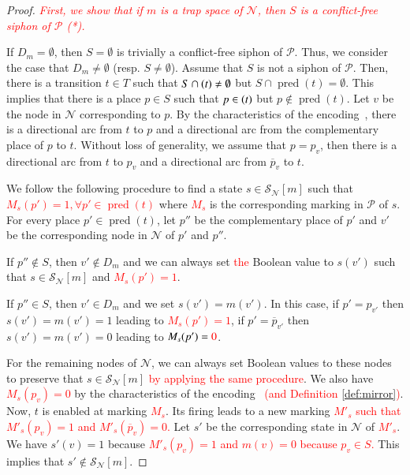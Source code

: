 \documentclass[preprint,12pt]{elsarticle}
\newcommand{\change}[1]{\textcolor{red}{#1}}
\DeclareMathOperator{\pred}{pred}
\let\succ\relax
\DeclareMathOperator{\succ}{succ}
\begin{document}
\begin{proof}

  \change{\textit{First, we show that if \(m\) is a trap space of \(\mathcal{N}\), then \(S\) is a conflict-free siphon of \(\mathcal{P}\) (*).}}

  If \(D_m = \emptyset\), then \(S = \emptyset\) is trivially a conflict-free siphon of \(\mathcal{P}\).
  Thus, we consider the case that \(D_m \neq \emptyset\) (resp. \(S \neq \emptyset\)).
  Assume that \(S\) is not a siphon of \(\mathcal{P}\).
  Then, there is a transition \(t \in T\) such that \(S \cap \succ(t) \neq \emptyset\) but \(S \cap \pred(t) = \emptyset\).
  This implies that there is a place \(p \in S\) such that \(p \in \succ(t)\) but \(p \not \in \pred(t)\).
  Let \(v\) be the node in \(\mathcal{N}\) corresponding to \(p\).
  By the characteristics of the encoding~\cite{chaouiya2004qualitative}, there is a directional arc from \(t\) to \(p\) and a directional arc from the complementary place of \(p\) to \(t\).
  Without loss of generality, we assume that \(p = p_v\), then there is a directional arc from \(t\) to \(p_v\) and a directional arc from \(\overline{p}_v\) to \(t\).

  We follow the following procedure to find a state \(s \in \mathcal{S}_{\mathcal{N}}[m]\) such that \change{\(M_s(p') = 1, \forall p' \in \pred(t)\)} where \change{\(M_s\)} is the corresponding marking in \(\mathcal{P}\) of \(s\).
  For every place \(p' \in \pred(t)\), let \(p''\) be the complementary place of \(p'\) and \(v'\) be the corresponding node in \(\mathcal{N}\) of \(p'\) and \(p''\).

  If \(p'' \not \in S\), then \(v' \not \in D_m\) and we can always set \change{the} Boolean value to \(s(v')\) such that \(s \in \mathcal{S}_{\mathcal{N}}[m]\) and \change{\(M_s(p') = 1\)}.

  If \(p'' \in S\), then \(v' \in D_m\) and we set \(s(v') = m(v')\).
  In this case, if \(p' = p_{v'}\) then \(s(v') = m(v') = 1\) leading to \change{\(M_s(p') = 1\)}, if \(p' = \overline{p}_{v'}\) then \(s(v') = m(v') = 0\) leading to \change{\(M_s(p') = \change{0}\)}.

  For the remaining nodes of \(\mathcal{N}\), we can always set Boolean values to these nodes to preserve that \(s \in \mathcal{S}_{\mathcal{N}}[m]\) \change{by applying the same procedure}.
  We also have \change{\(M_s(p_v) = 0\)} by the characteristics of the encoding~\cite{chaouiya2004qualitative} \change{(and Definition \ref{def:mirror})}.
  Now, \(t\) is enabled at marking \change{\(M_s\)}.
  Its firing leads to a new marking \change{\(M'_s\) such that \(M'_s(p_v) = 1\) and \(M'_s(\overline{p}_v) = 0\).}
  Let \(s'\) be the corresponding state in \(\mathcal{N}\) of \change{\(M'_s\)}.
  We have \(s'(v) = 1\) because \change{\(M'_s(p_v) = 1\) and \(m(v) = 0\) because \(p_v \in S\).}
  This implies that \(s' \not \in \mathcal{S}_{\mathcal{N}}[m]\).


\end{proof}
\end{document}
